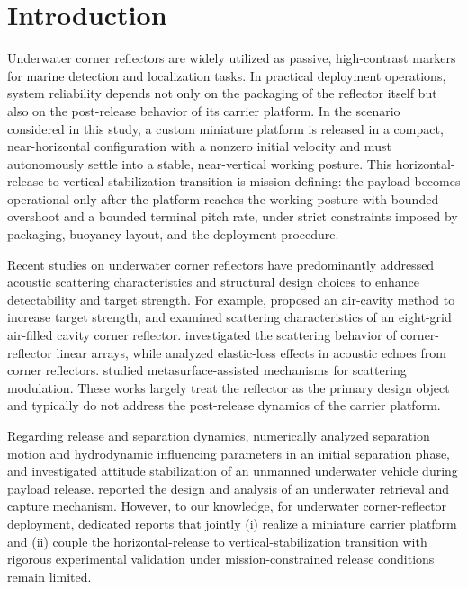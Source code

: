 \section{Introduction}

Underwater corner reflectors are widely utilized as passive, high-contrast markers for marine detection and localization tasks. In practical deployment operations, system reliability depends not only on the packaging of the reflector itself but also on the post-release behavior of its carrier platform. In the scenario considered in this study, a custom miniature platform is released in a compact, near-horizontal configuration with a nonzero initial velocity and must autonomously settle into a stable, near-vertical working posture. This horizontal-release to vertical-stabilization transition is mission-defining: the payload becomes operational only after the platform reaches the working posture with bounded overshoot and a bounded terminal pitch rate, under strict constraints imposed by packaging, buoyancy layout, and the deployment procedure.

Recent studies on underwater corner reflectors have predominantly addressed acoustic scattering characteristics and structural design choices to enhance detectability and target strength. For example, \citet{Luo2020AirCavityCornerReflector} proposed an air-cavity method to increase target strength, and \citet{Chu2022EightGridAirCavityCornerReflector} examined scattering characteristics of an eight-grid air-filled cavity corner reflector. \citet{Xiao2025CornerReflectorLinearArrays} investigated the scattering behavior of corner-reflector linear arrays, while \citet{Luo2025ElasticLossCornerReflector} analyzed elastic-loss effects in acoustic echoes from corner reflectors. \citet{Du2023MetasurfaceCornerReflector} studied metasurface-assisted mechanisms for scattering modulation. These works largely treat the reflector as the primary design object and typically do not address the post-release dynamics of the carrier platform.

Regarding release and separation dynamics, \citet{Wang2024AUVInitialSeparation} numerically analyzed separation motion and hydrodynamic influencing parameters in an initial separation phase, and \citet{Deng2024PayloadReleaseAttitudeStabilization} investigated attitude stabilization of an unmanned underwater vehicle during payload release. \citet{Zhang2025RetrievalCaptureMechanism} reported the design and analysis of an underwater retrieval and capture mechanism. However, to our knowledge, for underwater corner-reflector deployment, dedicated reports that jointly (i) realize a miniature carrier platform and (ii) couple the horizontal-release to vertical-stabilization transition with rigorous experimental validation under mission-constrained release conditions remain limited.

